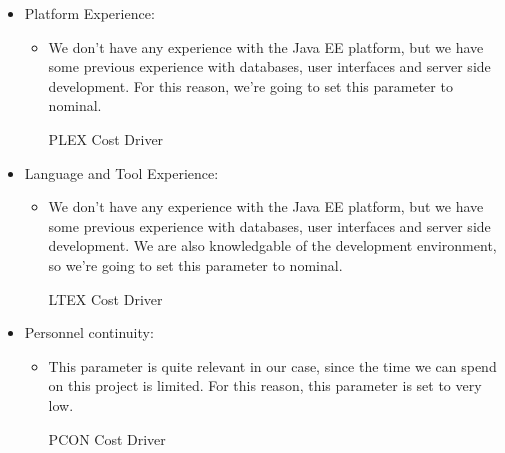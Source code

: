 \begin{itemize}
	\item Platform Experience: 
	\begin{itemize}
	\item[] We don't have any experience with the Java EE platform, but we have some previous experience with databases, user interfaces and server side development. For this reason, we're going to set this parameter to nominal.
	\begin{costdriverstable}{PLEX Cost Driver}
		\hline
	\end{costdriverstable}
	\end{itemize}
\end{itemize}

\begin{itemize}
	\item Language and Tool Experience: 
	\begin{itemize}
	\item[] We don't have any experience with the Java EE platform, but we have some previous experience with databases, user interfaces and server side development. We are also knowledgable of the development environment, so we're going to set this parameter to nominal.
	\begin{costdriverstable}{LTEX Cost Driver}
		\hline
	\end{costdriverstable}
	\end{itemize}
\end{itemize}

\begin{itemize}
	\item Personnel continuity: 
	\begin{itemize}
	\item[] This parameter is quite relevant in our case, since the time we can spend on this project is limited. For this reason, this parameter is set to very low. 
	\begin{costdriverstable}{PCON Cost Driver}
		\hline	
	\end{costdriverstable}
	\end{itemize}
\end{itemize}

